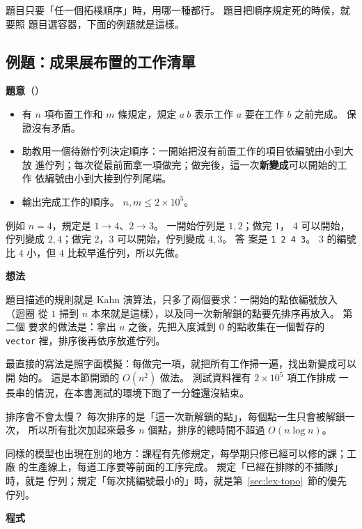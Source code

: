 題目只要「任一個拓樸順序」時，用哪一種都行。 題目把順序規定死的時候，就要照
題目選容器，下面的例題就是這樣。

\subsection{例題：成果展布置的工作清單}
\label{sec:ex-checklist}

\textbf{題意}（）

\begin{itemize}
\item 有 $n$ 項布置工作和 $m$ 條規定，規定 $a\ b$ 表示工作 $a$ 要在工作 $b$
之前完成。 保證沒有矛盾。
\item 助教用一個待辦佇列決定順序：一開始把沒有前置工作的項目依編號由小到大放
進佇列；每次從最前面拿一項做完；做完後，這一次\textbf{新變成}可以開始的工作
依編號由小到大接到佇列尾端。
\item 輸出完成工作的順序。 $n, m \le 2 \times 10^5$。
\end{itemize}

例如 $n = 4$，規定是 $1 \to 4$、$2 \to 3$。 一開始佇列是 $1, 2$；做完 $1$，
$4$ 可以開始，佇列變成 $2, 4$；做完 $2$，$3$ 可以開始，佇列變成 $4, 3$。 答
案是 \texttt{1 2 4 3}。 $3$ 的編號比 $4$ 小，但 $4$ 比較早進佇列，所以先做。

\textbf{想法}

題目描述的規則就是 Kahn 演算法，只多了兩個要求：一開始的點依編號放入（迴圈
從 $1$ 掃到 $n$ 本來就是這樣），以及同一次新解鎖的點要先排序再放入。 第二個
要求的做法是：拿出 $u$ 之後，先把入度減到 $0$ 的點收集在一個暫存的
\texttt{vector} 裡，排序後再依序放進佇列。

最直接的寫法是照字面模擬：每做完一項，就把所有工作掃一遍，找出新變成可以開
始的。 這是本節開頭的 $O(n^2)$ 做法。 測試資料裡有 $2 \times 10^5$ 項工作排成
一長串的情況，在本書測試的環境下跑了一分鐘還沒結束。

排序會不會太慢？ 每次排序的是「這一次新解鎖的點」，每個點一生只會被解鎖一次，
所以所有批次加起來最多 $n$ 個點，排序的總時間不超過 $O(n \log n)$。

同樣的模型也出現在別的地方：課程有先修規定，每學期只修已經可以修的課；工廠
的生產線上，每道工序要等前面的工序完成。 規定「已經在排隊的不插隊」時，就是
佇列；規定「每次挑編號最小的」時，就是第~\ref{sec:lex-topo}~節的優先佇列。

\textbf{程式}

